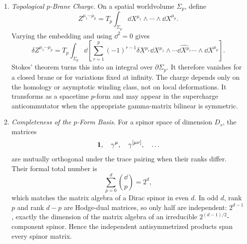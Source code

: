 \begin{enumerate}
  \begin{enumerate}
    \item \emph{Topological \(p\)-Brane Charge.}
    On a spatial worldvolume \(\Sigma_p\), define
      \[
        Z^{\mu_1\cdots\mu_p}
          =T_p\int_{\Sigma_p}
            \dd X^{\mu_1}\wedge\cdots\wedge \dd X^{\mu_p}.
      \]
      Varying the embedding and using \(\dd^2=0\) gives
      \[
        \delta Z^{\mu_1\cdots\mu_p}
          =T_p\int_{\Sigma_p}\dd\!\left[
            \sum_{r=1}^p(-1)^{r-1}\delta X^{\mu_r}
            \dd X^{\mu_1}\wedge\cdots\widehat{\dd X^{\mu_r}}
            \cdots\wedge \dd X^{\mu_p}\right].
      \]
      Stokes' theorem turns this into an integral over
      \(\partial\Sigma_p\).  It therefore vanishes for a closed brane or
      for variations fixed at infinity.  The charge depends only on the
      homology or asymptotic winding class, not on local deformations.
      It transforms as a spacetime \(p\)-form and may appear in the
      supercharge anticommutator when the appropriate gamma-matrix
      bilinear is symmetric.
    \item \emph{Completeness of the \(p\)-Form Basis.}
    For a spinor space of dimension \(D_s\), the matrices
      \[
        {\bf1},\quad\gamma^\mu,\quad
        \gamma^{[\mu\nu]},\quad\ldots
      \]
      are mutually orthogonal under the trace pairing when their ranks
      differ.  Their formal total number is
      \[
        \sum_{p=0}^d\binom \dd p=2^d,
      \]
      which matches the matrix algebra of a Dirac spinor in even \(d\).
      In odd \(d\), rank \(p\) and rank \(d-p\) are Hodge-dual matrices, so
      only half are independent: \(2^{d-1}\), exactly the dimension of the
      matrix algebra of an irreducible \(2^{(d-1)/2}\)-component spinor.
      Hence the independent antisymmetrized products span every spinor
      matrix.


\end{enumerate}
\end{enumerate}
